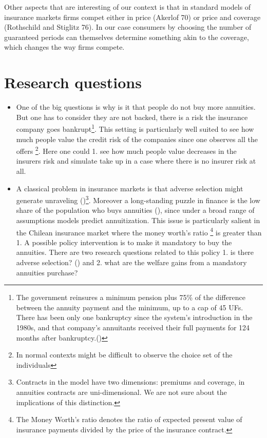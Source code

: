 \documentclass[12pt]{article}
\theoremstyle{plain}
\theoremstyle{plain}
\begin{document}
Other aspects that are interesting of our context is that in standard models of insurance markets firms compet either in price (Akerlof 70) or price and coverage (Rothschild and Stiglitz 76). In our case consumers by choosing the number of guaranteed periods can themselves determine something akin to the coverage, which changes the way firms compete.  

\section{Research questions}

\begin{itemize}
    \item One of the big questions is why is it that people do not buy more annuities. But one has to consider they are not backed, there is a risk the insurance company goes bankrupt\footnote{The government reinsures a minimum pension plus 75\% of the difference between the annuity payment and the minimum, up to a cap of 45 UFs. There has been only one bankruptcy since the system’s introduction in the 1980s, and that company’s annuitants received their full payments for 124 months after bankruptcy.(\cite{illanes_retirement_2019})}. This setting is particularly well suited to see how much people value the credit risk of the companies since one observes all the offers \footnote{In normal contexts might be difficult to observe the choice set of the individuals}. Here one could 1. see how much people value decreases in the insurers risk and simulate take up in a case where there is no insurer risk at all. 

    \item A classical problem in insurance markets is that adverse selection might generate unraveling (\cite{rothschild_equilibrium_1976})\footnote{Contracts in the \textcite{rothschild_equilibrium_1976} model have two dimensions: premiums and coverage, in annuities contracts are uni-dimensional. We are not sure about the implications of this distinction.}. Moreover a long-standing puzzle in finance is the low share of the population who buys annuities (\cite{modigliani_life_1986}), since under a broad range of assumptions models predict annuitization. This issue is particularly salient in the Chilean insurance market where the money worth's ratio \footnote{The Money Worth's ratio denotes the ratio of expected present value of insurance payments divided by the price of the insurance contract.} is greater than 1. A possible policy intervention is to make it mandatory to buy the annuities. There are two research questions related to this policy 1. is there adverse selection? (\cite{chiappori_testing_2000, einav_estimating_2010}) and 2. what are the welfare gains from a mandatory annuities purchase? 


\end{itemize}
\end{document}
